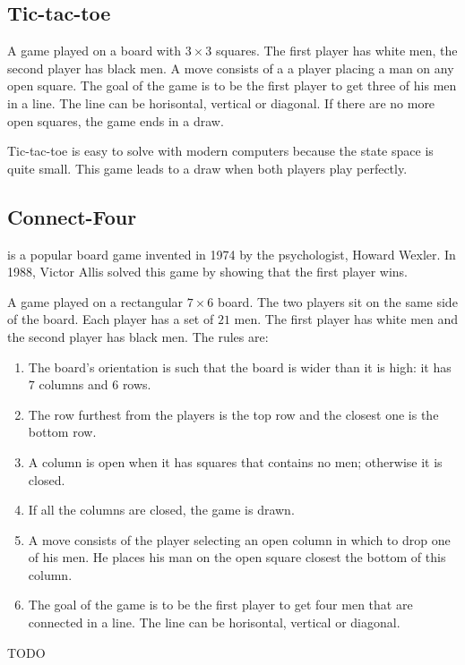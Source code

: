 \subsection{Tic-tac-toe}
 {A game played on a board with $3 \times 3$ squares.  The first player has white men, the second player has black men. A move consists of a a player placing a man on any open square.  The goal of the game is to be the first player to get three of his men in a line.  The line can be horisontal, vertical or diagonal.  If there are no more open squares, the game ends in a draw.}  

Tic-tac-toe is easy to solve with modern computers because the state space is quite small.  This game leads to a draw when both players play perfectly.

\subsection{Connect-Four}
 is a popular board game invented in 1974 by the psychologist, Howard Wexler.  In 1988, Victor Allis\cite{allis:masters} solved this game by showing that the first player wins.  

 {A game played on a rectangular $7 \times 6$ board. The two players sit on the same side of the board. Each player has a set of $21$ men.  The first player has white men and the second player has black men. The rules are:     
\begin{enumerate}
  \item The board's orientation is such that the board is wider than it is high: it has $7$ columns and $6$ rows.  
	\item The row furthest from the players is the top row and the closest one is the bottom row.
	\item A column is open when it has squares that contains no men; otherwise it is closed.
	\item If all the columns are closed, the game is drawn.
	\item A move consists of the player selecting an open column in which to drop one of his men.  He places his man on the open square closest the bottom of this column.  
	\item The goal of the game is to be the first player to get four men that are connected in a line.  The line can be horisontal, vertical or diagonal.
\end{enumerate}
}

TODO \cite{stenmark:masters}
